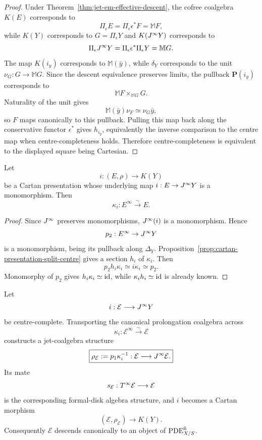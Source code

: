 \begin{proof}
Under Theorem~\ref{thm:jet-em-effective-descent}, the cofree coalgebra $K(E)$ corresponds to
\[
    \Pi_\epsilon E
    =
    \Pi_\epsilon\epsilon^*F
    =
    \mathbb M F,
\]
while $K(Y)$ corresponds to $G=\Pi_\epsilon Y$ and $K(J^{\infty} Y)$ corresponds to
\[
    \Pi_\epsilon J^{\infty} Y
    =
    \Pi_\epsilon\epsilon^*\Pi_\epsilon Y
    =
    \mathbb M G.
\]
The map $K(i_y)$ corresponds to $\mathbb M(\bar y)$, while $\delta_Y$ corresponds to the unit $\nu_G:G\to\mathbb M G$.  Since the descent equivalence preserves limits, the pullback $\mathbf P(i_y)$ corresponds to
\[
    \mathbb M F\times_{\mathbb M G}G.
\]
Naturality of the unit gives
\[
    \mathbb M(\bar y)\nu_F\simeq\nu_G\bar y,
\]
so $F$ maps canonically to this pullback.  Pulling this map back along the conservative functor $\epsilon^*$ gives $h_{i_y}$, equivalently the inverse comparison to the centre map when centre-completeness holds.  Therefore centre-completeness is equivalent to the displayed square being Cartesian.
\end{proof}

\begin{theorem}
\label{thm:embedded-cartan-integrability}
Let
\[
    i:(E,\rho)\longrightarrow K(Y)
\]
be a Cartan presentation whose underlying map $i:E\to J^{\infty} Y$ is a monomorphism.  Then
\[
    \kappa_i:E^\infty\xrightarrow{\sim}E.
\]
\end{theorem}

\begin{proof}
Since $J^{\infty}$ preserves monomorphisms, $J^{\infty}(i)$ is a monomorphism.  Hence
\[
    p_2:E^\infty\to J^{\infty} Y
\]
is a monomorphism, being its pullback along $\Delta_Y$.  Proposition~\ref{prop:cartan-presentation-split-centre} gives a section $h_i$ of $\kappa_i$.  Then
\[
    p_2h_i\kappa_i
    \simeq
    i\kappa_i
    \simeq
    p_2.
\]
Monomorphy of $p_2$ gives $h_i\kappa_i\simeq\operatorname{id}$, while $\kappa_i h_i\simeq\operatorname{id}$ is already known.
\end{proof}

\begin{proposition}
\label{thm:integrable-pde-coalgebra}
Let
\[
    i:\mathcal E\longrightarrow J^{\infty} Y
\]
be centre-complete.  Transporting the canonical prolongation coalgebra across
\[
    \kappa_i:\mathcal E^\infty\xrightarrow{\sim}\mathcal E
\]
constructs a jet-coalgebra structure
\[
    \boxed{
    \rho_{\mathcal E}:=p_1\kappa_i^{-1}:
    \mathcal E\longrightarrow J^{\infty}\mathcal E.
    }
\]
Its mate
\[
    s_{\mathcal E}:T^{\infty}\mathcal E\longrightarrow\mathcal E
\]
is the corresponding formal-disk algebra structure, and $i$ becomes a Cartan morphism
\[
    (\mathcal E,\rho_{\mathcal E})\longrightarrow K(Y).
\]
Consequently $\mathcal E$ descends canonically to an object of $\operatorname{PDE}^{\mathrm{fi}}_{X/S}$.
\end{proposition}

